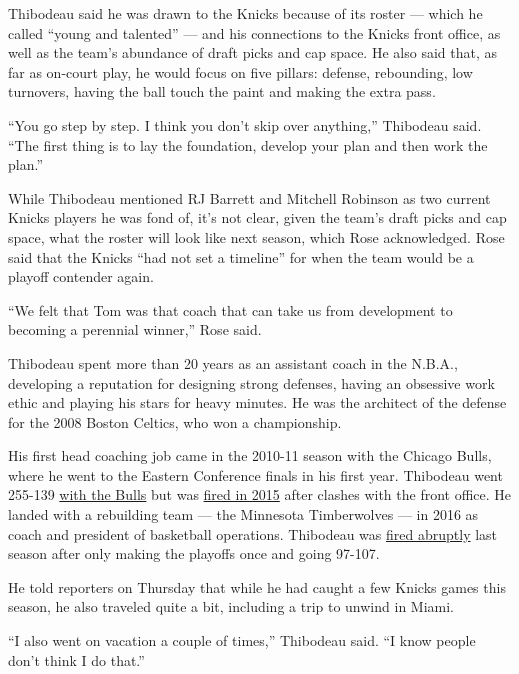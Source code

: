 Thibodeau said he was drawn to the Knicks because of its roster ---
which he called ``young and talented'' --- and his connections to the
Knicks front office, as well as the team's abundance of draft picks and
cap space. He also said that, as far as on-court play, he would focus on
five pillars: defense, rebounding, low turnovers, having the ball touch
the paint and making the extra pass.

``You go step by step. I think you don't skip over anything,'' Thibodeau
said. ``The first thing is to lay the foundation, develop your plan and
then work the plan.''

While Thibodeau mentioned RJ Barrett and Mitchell Robinson as two
current Knicks players he was fond of, it's not clear, given the team's
draft picks and cap space, what the roster will look like next season,
which Rose acknowledged. Rose said that the Knicks ``had not set a
timeline'' for when the team would be a playoff contender again.

``We felt that Tom was that coach that can take us from development to
becoming a perennial winner,'' Rose said.

Thibodeau spent more than 20 years as an assistant coach in the N.B.A.,
developing a reputation for designing strong defenses, having an
obsessive work ethic and playing his stars for heavy minutes. He was the
architect of the defense for the 2008 Boston Celtics, who won a
championship.

His first head coaching job came in the 2010-11 season with the Chicago
Bulls, where he went to the Eastern Conference finals in his first year.
Thibodeau went 255-139
\href{https://www.basketball-reference.com/coaches/thiboto99c.html}{with
the Bulls} but was
\href{https://www.chicagotribune.com/sports/bulls/ct-tom-thibodeau-fired-20150528-story.html}{fired
in 2015} after clashes with the front office. He landed with a
rebuilding team --- the Minnesota Timberwolves --- in 2016 as coach and
president of basketball operations. Thibodeau was
\href{https://www.nytimes3xbfgragh.onion/2019/01/06/sports/tom-thibodeau-fired-timberwolves.html}{fired
abruptly} last season after only making the playoffs once and going
97-107.

He told reporters on Thursday that while he had caught a few Knicks
games this season, he also traveled quite a bit, including a trip to
unwind in Miami.

``I also went on vacation a couple of times,'' Thibodeau said. ``I know
people don't think I do that.''

